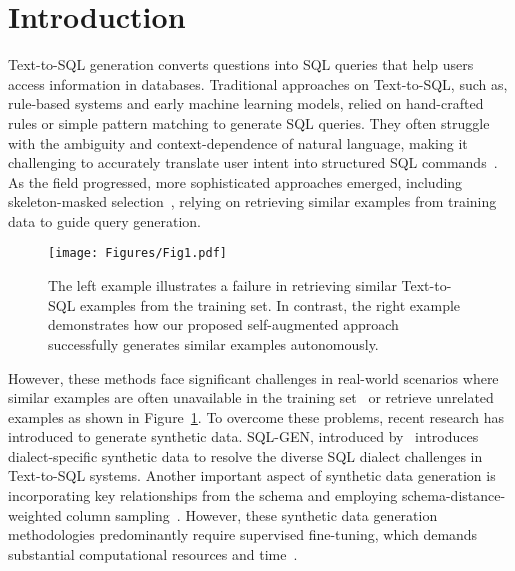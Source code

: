 \section{Introduction}


Text-to-SQL generation converts questions into SQL queries that help users access information in databases. 
Traditional approaches on Text-to-SQL, such as, rule-based systems and early machine learning models, relied on hand-crafted rules or simple pattern matching to generate SQL queries. They often struggle with the ambiguity and context-dependence of natural language, making it challenging to accurately translate user intent into structured SQL commands~\cite{SQLsurvey,rulebased_limitation,Rule_based_constructing}. As the field progressed, more sophisticated approaches emerged, including skeleton-masked selection~\cite{dail_sql}, relying on retrieving similar examples from training data to guide query generation. 
\begin{figure}[t]
\centerline{\texttt{[image: Figures/Fig1.pdf]}}
\caption{The left example illustrates a failure in retrieving similar Text-to-SQL examples from the training set. In contrast, the right example demonstrates how our proposed self-augmented approach successfully generates similar examples autonomously.}
\label{fig:first_main}
\vspace{-5mm}
\end{figure}
However, these methods face significant challenges in real-world scenarios where similar examples are often unavailable in the training set~\cite{explore_limitation,Text_to_sql_survey} or retrieve unrelated examples as shown in Figure~\ref{fig:first_main}. To overcome these problems, recent research has introduced to generate synthetic data. SQL-GEN, introduced by~\cite{Dailect_gap_synthetic} introduces dialect-specific synthetic data to resolve the diverse SQL dialect challenges in Text-to-SQL systems. Another important aspect of synthetic data generation is incorporating key relationships from the schema and employing schema-distance-weighted column sampling~\cite{Importance_of_synthesizeing}. However, these synthetic data generation methodologies predominantly require supervised fine-tuning, which demands substantial computational resources and time~\cite{synthesize}. 

